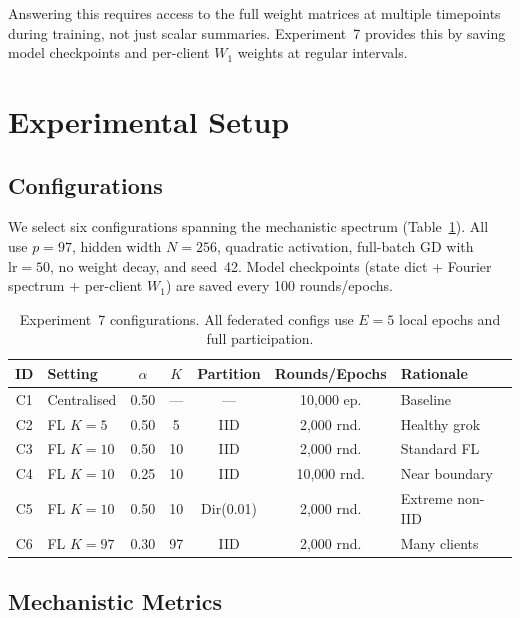 \documentclass{article}
\begin{document}
Answering this requires access to the full weight matrices at multiple
timepoints during training, not just scalar summaries.  Experiment~7 provides
this by saving model checkpoints and per-client $W_1$ weights at regular
intervals.

\section{Experimental Setup}

\subsection{Configurations}

We select six configurations spanning the mechanistic spectrum
(Table~\ref{tab:exp7_configs}).  All use $p{=}97$, hidden width $N{=}256$,
quadratic activation, full-batch GD with $\mathrm{lr}{=}50$, no weight decay,
and seed~42.  Model checkpoints (state dict + Fourier spectrum + per-client
$W_1$) are saved every 100 rounds/epochs.

\begin{table}[h]
\centering
\caption{Experiment~7 configurations.  All federated configs use
$E{=}5$ local epochs and full participation.}
\label{tab:exp7_configs}
\small
\begin{tabular}{@{}clccccl@{}}
\toprule
ID & Setting & $\alpha$ & $K$ & Partition & Rounds/Epochs & Rationale \\
\midrule
C1 & Centralised     & 0.50 & --- & ---       & 10{,}000 ep. & Baseline \\
C2 & FL $K{=}5$      & 0.50 & 5   & IID       & 2{,}000 rnd. & Healthy grok \\
C3 & FL $K{=}10$     & 0.50 & 10  & IID       & 2{,}000 rnd. & Standard FL \\
C4 & FL $K{=}10$     & 0.25 & 10  & IID       & 10{,}000 rnd. & Near boundary \\
C5 & FL $K{=}10$     & 0.50 & 10  & Dir(0.01) & 2{,}000 rnd. & Extreme non-IID \\
C6 & FL $K{=}97$     & 0.30 & 97  & IID       & 2{,}000 rnd. & Many clients \\
\bottomrule
\end{tabular}
\end{table}

\subsection{Mechanistic Metrics}
\end{document}
